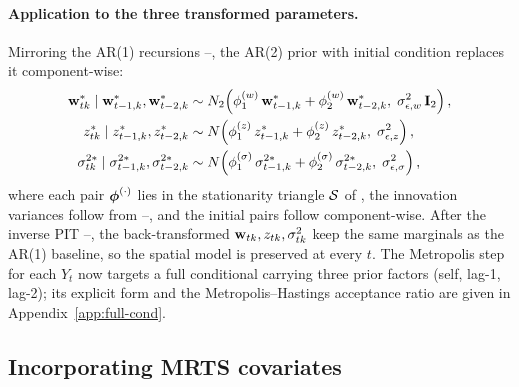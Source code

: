 \documentclass[12pt]{article}
\begin{document}
\paragraph{Application to the three transformed parameters.}
Mirroring the AR(1) recursions --, the AR(2) prior  with initial condition  replaces it component-wise:
\begin{align}
  \mbox{\bf w}^*_{tk} \mid \mbox{\bf w}^*_{t-1, k}, \mbox{\bf w}^*_{t-2, k}
    &\sim N_2\!\left(\phi^{(w)}_1\, \mbox{\bf w}^*_{t-1, k} + \phi^{(w)}_2\, \mbox{\bf w}^*_{t-2, k},\; \sigma_{\epsilon, w}^2\, \mbox{\bf I}_2\right), \label{eq:ar2-w}\\
  z^*_{tk} \mid z^*_{t-1, k}, z^*_{t-2, k}
    &\sim N\!\left(\phi^{(z)}_1\, z^*_{t-1, k} + \phi^{(z)}_2\, z^*_{t-2, k},\; \sigma_{\epsilon, z}^2\right), \label{eq:ar2-z}\\
  \sigma^{2*}_{tk} \mid \sigma^{2*}_{t-1, k}, \sigma^{2*}_{t-2, k}
    &\sim N\!\left(\phi^{(\sigma)}_1\, \sigma^{2*}_{t-1, k} + \phi^{(\sigma)}_2\, \sigma^{2*}_{t-2, k},\; \sigma_{\epsilon, \sigma}^2\right), \label{eq:ar2-sigma}
\end{align}
where each pair $\mbox{\boldmath $\phi$}^{(\cdot)}$ lies in the stationarity triangle ${\cal S}$ of , the innovation variances follow from --, and the initial pairs follow  component-wise.  After the inverse PIT --, the back-transformed $\mbox{\bf w}_{tk}, z_{tk}, \sigma^2_{tk}$ keep the same marginals as the AR(1) baseline, so the spatial \skewt model  is preserved at every $t$.  The Metropolis step for each $Y_t$ now targets a full conditional carrying three prior factors (self, lag-1, lag-2); its explicit form and the Metropolis--Hastings acceptance ratio are given in Appendix~\ref{app:full-cond}.

\subsection{Incorporating MRTS covariates}\label{sec:meth-mrts}
\end{document}
